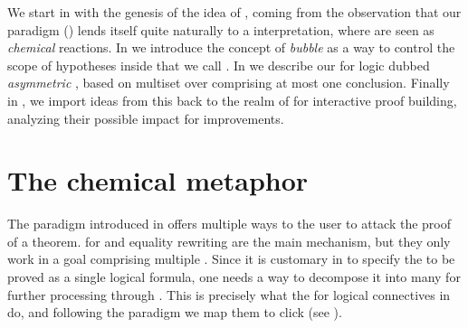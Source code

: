 \begin{scope}
We start in  with the genesis of the idea of , coming from the observation that our  paradigm
() lends itself quite naturally to a 
interpretation, where  are seen as \emph{chemical} reactions. In
 we introduce the concept of \emph{bubble} as a way to control
the scope of hypotheses inside  that we call
\emph{}. In  we describe our  for
 logic dubbed \emph{asymmetric }, based
on multiset  over  comprising at most one
conclusion. Finally in , we import ideas from this
 back to the realm of  for interactive proof
building, analyzing their possible impact for  improvements.

\section{The chemical metaphor}

The  paradigm introduced in  offers multiple ways to
the user to attack the proof of a theorem.   for 
and equality rewriting are the main mechanism, but they only work in a goal
comprising multiple . Since it is customary in  to specify
the  to be proved as a single logical formula, one needs a way to decompose
it into many  for further processing through . This is precisely what
the  for logical connectives in  do, and
following the  paradigm \cite{PbP} we map them to click
 (see ).


\end{scope}
